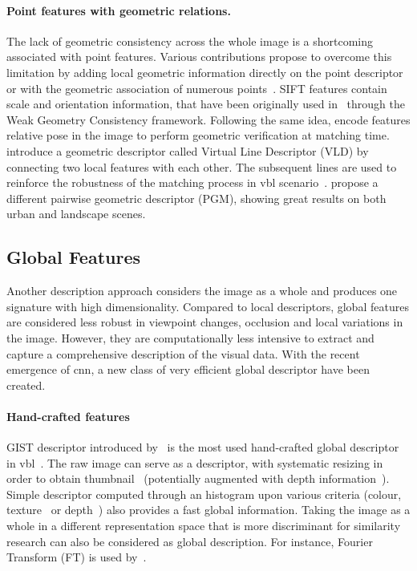 		\paragraph{Point features with geometric relations.}
        	The lack of geometric consistency across the whole image is a shortcoming associated with point features. Various contributions propose to overcome this limitation by adding local geometric information directly on the point descriptor~\citep{Baatz2012,Jegou2008} or with the geometric association of numerous points~\citep{Liu2012,Li2015}. SIFT features contain scale and orientation information, that have been originally used in~\citep{Jegou2008} through the Weak Geometry Consistency framework. Following the same idea, \citet{Baatz2012} encode features relative pose in the image to perform geometric verification at matching time. \citet{Liu2012} introduce a geometric descriptor called Virtual Line Descriptor (VLD) by connecting two local features with each other. The subsequent lines are used to reinforce the robustness of the matching process in \ac{vbl} scenario~\citep{Majdik2013}. \citet{Li2015} propose a different pairwise geometric descriptor (PGM), showing great results on both urban and landscape scenes.
			
	\subsection{Global Features}
	\label{subsec:global_feature}
		Another description approach considers the image as a whole and produces one signature with high dimensionality. Compared to local descriptors, global features are considered less robust in viewpoint changes, occlusion and local variations in the image. However, they are computationally less intensive to extract and capture a comprehensive description of the visual data. With the recent emergence of \ac{cnn}, a new class of very efficient global descriptor have been created.
		
		\paragraph{Hand-crafted features}
		 	GIST descriptor introduced by~\citet{Oliva2001} is the most used hand-crafted global descriptor in \ac{vbl}~\citep{Russell2011,Azzi2016,Hays2008}. The raw image can serve as a descriptor, with systematic resizing in order to obtain thumbnail~\citep{Hays2008,Corke2013} (potentially augmented with depth information~\citep{Gee2012}). Simple descriptor computed through an histogram upon various criteria (colour, texture~\citep{Hays2008} or depth~\citep{Ni2009}) also provides a fast global information. Taking the image as a whole in a different representation space that is more discriminant for similarity research can also be considered as global description. For instance, Fourier Transform (FT) is used by~\citet{Wan2016}.
			
